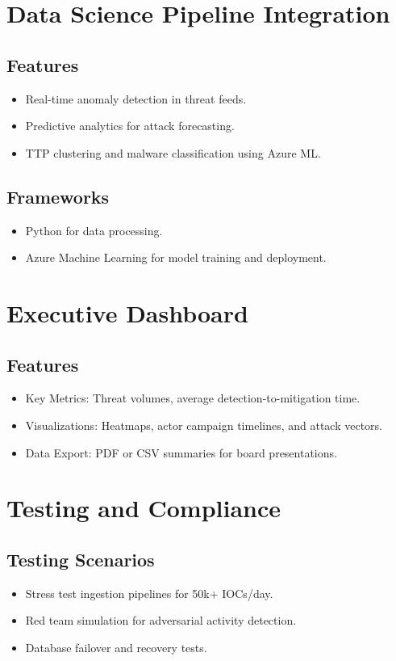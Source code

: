 \documentclass[12pt]{article}
\begin{document}
\section{Data Science Pipeline Integration}
\subsection{Features}
\begin{itemize}
    \item Real-time anomaly detection in threat feeds.
    \item Predictive analytics for attack forecasting.
    \item TTP clustering and malware classification using Azure ML.
\end{itemize}

\subsection{Frameworks}
\begin{itemize}
    \item Python for data processing.
    \item Azure Machine Learning for model training and deployment.
\end{itemize}

\section{Executive Dashboard}
\subsection{Features}
\begin{itemize}
    \item Key Metrics: Threat volumes, average detection-to-mitigation time.
    \item Visualizations: Heatmaps, actor campaign timelines, and attack vectors.
    \item Data Export: PDF or CSV summaries for board presentations.
\end{itemize}

\section{Testing and Compliance}
\subsection{Testing Scenarios}
\begin{itemize}
    \item Stress test ingestion pipelines for 50k+ IOCs/day.
    \item Red team simulation for adversarial activity detection.
    \item Database failover and recovery tests.
\end{itemize}
\end{document}
